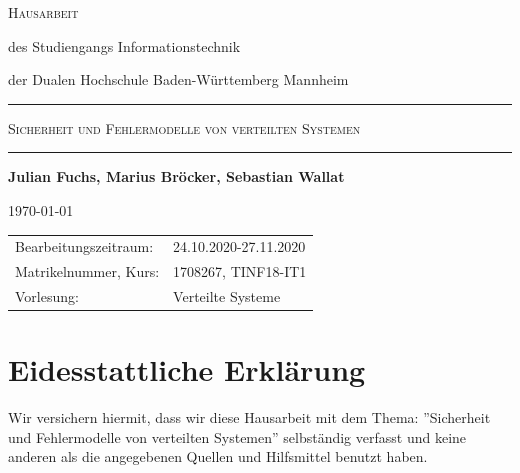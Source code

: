 \documentclass[12pt,a4paper,parskip=half]{scrreprt}
\begin{document}
\begin{titlepage}
{		}
		
		
		
		\bigskip
		
		
		
		\Large\textsc{Hausarbeit}
		
		
		
		\normalsize
		
		des Studiengangs Informationstechnik\par
		
		der Dualen Hochschule Baden-Württemberg Mannheim
		
		
		
		\rule{\textwidth}{.5mm}\bigskip
		
		
		
		\textsc{\large Sicherheit und Fehlermodelle von verteilten Systemen}	
		
		
		\rule{\textwidth}{.5mm}
		
		
		
		\vfill
		
		
		
		\par
		
		{\bfseries\large Julian Fuchs, Marius Bröcker, Sebastian Wallat}\par
		
		\today
		
		
		
		\vfill
		
		
		
		\small{%
			
			\begin{tabularx}{\textwidth}{@{}lX@{}}
				
				\toprule
				
				
				Bearbeitungszeitraum: & 24.10.2020-27.11.2020\\
				
				Matrikelnummer, Kurs: & 1708267, TINF18-IT1\\
				
				Vorlesung: & Verteilte Systeme \\
				
			\end{tabularx}
			
		}
		
		\cleardoublepage
		
	\end{titlepage}
	
	
	\newpage
	
	\chapter*{Eidesstattliche Erklärung}
	\vspace{50pt}
	Wir versichern hiermit, dass wir diese Hausarbeit mit dem Thema: ''Sicherheit und Fehlermodelle von verteilten Systemen'' selbständig verfasst und keine anderen als die angegebenen Quellen und Hilfsmittel benutzt haben.
	\\
	\\
	
\end{document}
